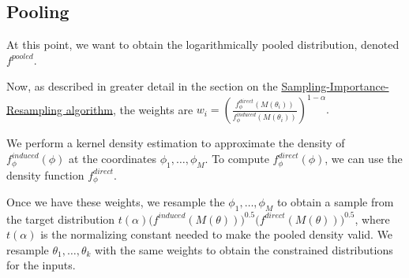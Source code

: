 \documentclass[12pt,twoside]{smiththesis}
\begin{document}
\hypertarget{pooling}{%
\subsection{Pooling}\label{pooling}}

At this point, we want to obtain the logarithmically pooled distribution, denoted \(f^{pooled}\).

Now, as described in greater detail in the section on the \protect\hyperlink{logpooled}{Sampling-Importance-Resampling algorithm}, the weights are \(w_i = \left( \frac{f_\phi^{direct}(M(\theta_i))}{f_\phi^{induced}(M(\theta_i))} \right)^{1-\alpha}.\)

We perform a kernel density estimation to approximate the density of \(f_\phi^{induced}(\phi)\) at the coordinates \(\phi_1, \dots, \phi_M\). To compute \(f_\phi^{direct}(\phi)\), we can use the density function \(f_\phi^{direct}\).

Once we have these weights, we resample the \(\phi_1,\dots,\phi_M\) to obtain a sample from the target distribution \(t(\alpha) \Big( f^{induced}(M(\theta)) \Big)^{0.5} \Big( f^{direct} (M(\theta)) \Big)^{0.5}\), where \(t(\alpha)\) is the normalizing constant needed to make the pooled density valid. We resample \(\theta_1, \dots, \theta_k\) with the same weights to obtain the constrained distributions for the inputs.
\end{document}
